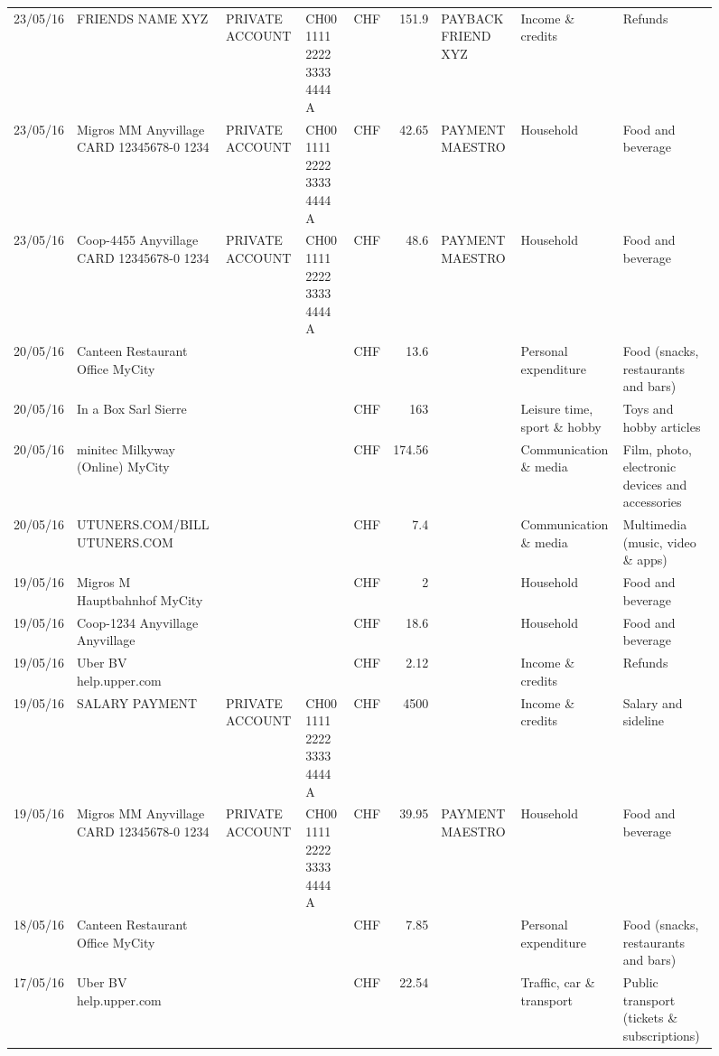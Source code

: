 \begin{landscape}
\begin{sidewaysfigure}
\begin{table}[h]
\begin{center}
\begin{tabular}{rllllrlll}
		23/05/16 & FRIENDS NAME XYZ & PRIVATE ACCOUNT & CH00 1111 2222 3333 4444 A & CHF   & 151.9 & PAYBACK FRIEND XYZ & Income \& credits & Refunds \\
		23/05/16 & Migros MM Anyvillage CARD 12345678-0 1234 & PRIVATE ACCOUNT & CH00 1111 2222 3333 4444 A & CHF   & 42.65 & PAYMENT MAESTRO & Household & Food and beverage \\
		23/05/16 & Coop-4455 Anyvillage CARD 12345678-0 1234 & PRIVATE ACCOUNT & CH00 1111 2222 3333 4444 A & CHF   & 48.6  & PAYMENT MAESTRO & Household & Food and beverage \\
		20/05/16 & Canteen Restaurant Office      MyCity &       &       & CHF   & 13.6  &       & Personal expenditure & Food (snacks, restaurants and bars) \\
		20/05/16 & In a Box Sarl            Sierre &       &       & CHF   & 163   &       & Leisure time, sport \& hobby & Toys and hobby articles \\
		20/05/16 & minitec Milkyway (Online) MyCity &       &       & CHF   & 174.56 &       & Communication \& media & Film, photo, electronic devices and accessories \\
		20/05/16 & UTUNERS.COM/BILL          UTUNERS.COM &       &       & CHF   & 7.4   &       & Communication \& media & Multimedia (music, video \& apps) \\
		19/05/16 & Migros M Hauptbahnhof    MyCity &       &       & CHF   & 2     &       & Household & Food and beverage \\
		19/05/16 & Coop-1234 Anyvillage    Anyvillage &       &       & CHF   & 18.6  &       & Household & Food and beverage \\
		19/05/16 & Uber BV                  help.upper.com &       &       & CHF   & 2.12  &       & Income \& credits & Refunds \\
		19/05/16 & SALARY PAYMENT & PRIVATE ACCOUNT & CH00 1111 2222 3333 4444 A & CHF   & 4500  &       & Income \& credits & Salary and sideline \\
		19/05/16 & Migros MM Anyvillage CARD 12345678-0 1234 & PRIVATE ACCOUNT & CH00 1111 2222 3333 4444 A & CHF   & 39.95 & PAYMENT MAESTRO & Household & Food and beverage \\
		18/05/16 & Canteen Restaurant Office      MyCity &       &       & CHF   & 7.85  &       & Personal expenditure & Food (snacks, restaurants and bars) \\
		17/05/16 & Uber BV                  help.upper.com &       &       & CHF   & 22.54 &       & Traffic, car \& transport & Public transport (tickets \& subscriptions) \\

\end{tabular}
\end{center}
\end{table}
\end{sidewaysfigure}
\end{landscape}
